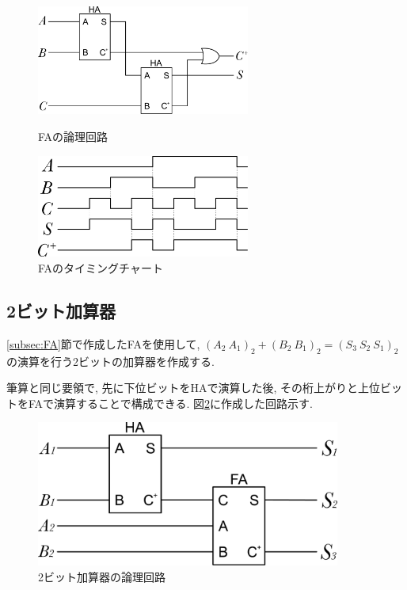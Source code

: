\documentclass[titlepage]{jsarticle}
\begin{document}
    \begin{figure}[h]
      \begin{minipage}{0.495\hsize}
        \centering
        \includegraphics[width=7cm]{images/fa.pdf}
        \caption{FAの論理回路}
        \label{fig:full_adder}
      \end{minipage}
      \begin{minipage}{0.495\hsize}
        \centering
        \includegraphics[width=7cm]{images/fa_timing.pdf}
        \caption{FAのタイミングチャート}
        \label{fig:full_adder_timing}
      \end{minipage}
    \end{figure}
  \subsection{2ビット加算器}
    \ref{subsec:FA}節で作成したFAを使用して, $(A_2 \ A_1)_2 + (B_2 \ B_1)_2 = (S_3 \ S_2 \ S_1)_2$
    の演算を行う2ビットの加算器を作成する.

    筆算と同じ要領で, 先に下位ビットをHAで演算した後, その桁上がりと上位ビットをFAで演算することで構成できる.
    図\ref{fig:2bit_adder}に作成した回路示す.
    \begin{figure}[h]
      \centering
      \includegraphics[width=10cm]{images/2bit.pdf}
      \caption{2ビット加算器の論理回路}
      \label{fig:2bit_adder}
    \end{figure}
\end{document}
